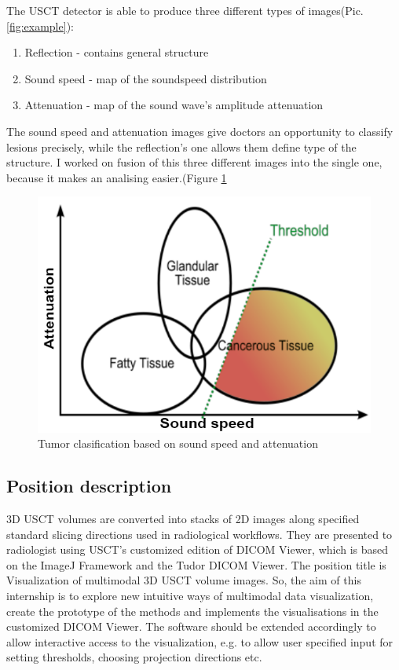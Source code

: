 \documentclass[english]{article}
\begin{document}
The USCT detector is able to produce three different types of images(Pic. \ref{fig:example}):

\begin{enumerate}
\item Reflection - contains general structure
\item Sound speed - map of the soundspeed distribution
\item Attenuation - map of the sound wave's amplitude attenuation
\end{enumerate}

The sound speed and attenuation images give doctors an opportunity to classify lesions precisely, while the reflection's one allows them define type of the structure. I worked on fusion of this three different images into the single one, because it makes an analising easier.(Figure \ref{fig:nicol}
\begin{figure}[H]
\centerline{\includegraphics[scale=0.5]{internship_report/nicol}}
\caption{Tumor clasification based on sound speed and attenuation\label{fig:nicol}}
\end{figure}
\subsection{Position description}

3D USCT volumes are converted into stacks of 2D images along specified standard slicing directions used in radiological workflows. They are presented to radiologist using USCT's customized edition of DICOM Viewer, which is based on the ImageJ Framework and the Tudor DICOM Viewer. The position title is Visualization of multimodal 3D USCT volume images. So, the aim of this internship is to explore new intuitive ways of multimodal data visualization, create the prototype of the methods and implements the visualisations in the customized DICOM Viewer. The software should be extended accordingly to allow interactive access to the visualization, e.g. to allow user specified input for setting thresholds, choosing projection directions etc.\\
\end{document}
